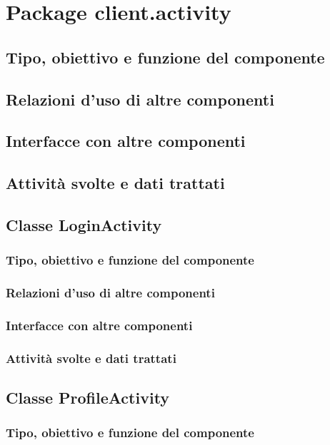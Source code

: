 \newpage
\section{Package client.activity} %
\subsection*{Tipo, obiettivo e funzione del componente}
\subsection*{Relazioni d'uso di altre componenti}
\subsection*{Interfacce con altre componenti}
\subsection*{Attivit\`a svolte e dati trattati}

\subsection{Classe LoginActivity}
\subsubsection*{Tipo, obiettivo e funzione del componente}
\subsubsection*{Relazioni d'uso di altre componenti}
\subsubsection*{Interfacce con altre componenti}
\subsubsection*{Attivit\`a svolte e dati trattati}

\subsection{Classe ProfileActivity}
\subsubsection*{Tipo, obiettivo e funzione del componente}
